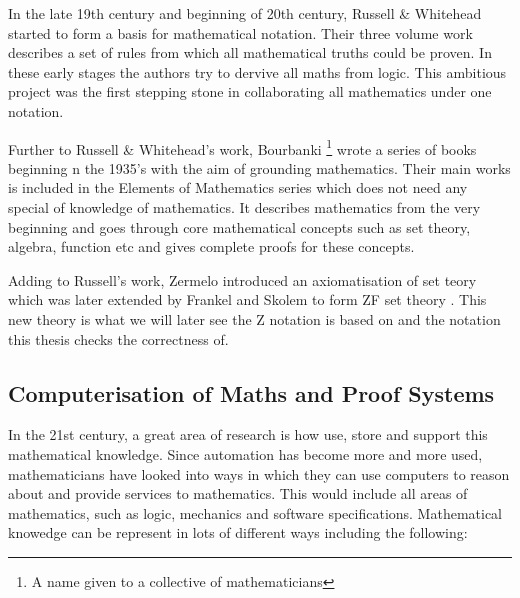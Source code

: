 In the late 19th century and beginning of 20th century, Russell \& Whitehead \cite{whitehead1912principia} started to form a basis for mathematical notation. Their three volume work describes a set of rules from which all mathematical truths could be proven. In these early stages the authors try to dervive all maths from logic. This ambitious project was the first stepping stone in collaborating all mathematics under one notation.

Further to Russell \& Whitehead's work, Bourbanki \footnote{A name given to a collective of mathematicians} wrote a series of books beginning n the 1935's with the aim of grounding mathematics. Their main works is included in the Elements of Mathematics series \cite{opac-b1128208} which does not need any special of knowledge of mathematics. It describes mathematics from the very beginning and goes through core mathematical concepts such as set theory, algebra, function etc and gives complete proofs for these concepts.

Adding to Russell's work, Zermelo introduced an axiomatisation of set teory which was later extended by Frankel and Skolem to form ZF set theory \cite{zfc}. This new theory is what we will later see the Z notation is based on and the notation this thesis checks the correctness of.

\subsection{Computerisation of Maths and Proof Systems}

In the 21st century, a great area of research is how use, store and support this mathematical knowledge. Since automation has become more and more used, mathematicians have looked into ways in which they can use computers to reason about and provide services to mathematics. This would include all areas of mathematics, such as logic, mechanics and software specifications. Mathematical knowedge can be represent in lots of different ways including the following:

